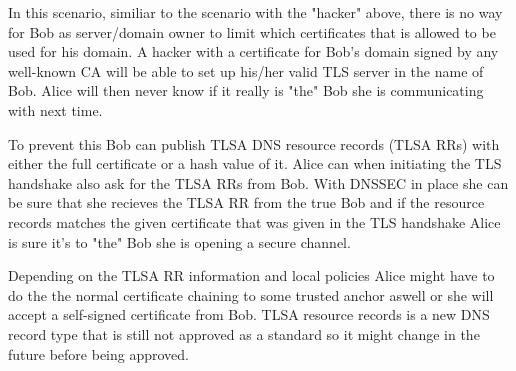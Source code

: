 In this scenario, similiar to the scenario with the "hacker" above, there is no way for Bob as server/domain owner to limit which certificates that is allowed to be used for his domain.
A hacker with a certificate for Bob's domain signed by any well-known CA will be able to set up his/her valid TLS server in the name of Bob.
Alice will then never know if it really is "the" Bob she is communicating with next time.

To prevent this Bob can publish TLSA DNS resource records (TLSA RRs)\cite[ch. 2]{rfc:draft-dane} with either the full certificate or a hash value of it.
Alice can when initiating the TLS handshake also ask for the TLSA RRs from Bob.
With DNSSEC in place she can be sure that she recieves the TLSA RR from the true Bob and if the resource records matches the given certificate that was given in the TLS handshake Alice is sure it's to "the" Bob she is opening a secure channel.

Depending on the TLSA RR information and local policies Alice might have to do the the normal certificate chaining to some trusted anchor aswell or she will accept a self-signed certificate from Bob.
TLSA resource records is a new DNS record type that is still not approved as a standard so it might change in the future before being approved.




